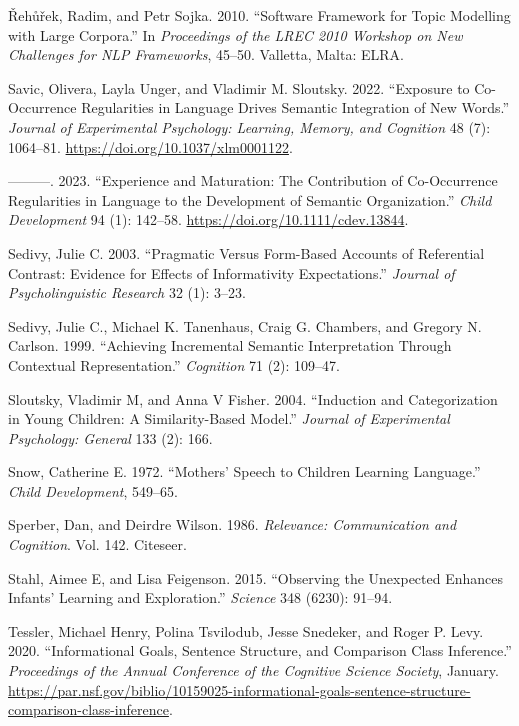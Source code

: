 \documentclass{ucetd}
\newlength{\cslhangindent}
\newenvironment{cslreferences}%
{\setlength{\parindent}{0pt}%
\everypar{\setlength{\hangindent}{\cslhangindent}}\ignorespaces}%
{\par}
\begin{document}
\begin{cslreferences}
\leavevmode\hypertarget{ref-rehurek2010}{}%
Řehůřek, Radim, and Petr Sojka. 2010. ``Software Framework for Topic
Modelling with Large Corpora.'' In \emph{Proceedings of the LREC 2010
Workshop on New Challenges for NLP Frameworks}, 45--50. Valletta, Malta:
ELRA.

\leavevmode\hypertarget{ref-savic_exposure_2022}{}%
Savic, Olivera, Layla Unger, and Vladimir M. Sloutsky. 2022. ``Exposure
to Co-Occurrence Regularities in Language Drives Semantic Integration of
New Words.'' \emph{Journal of Experimental Psychology: Learning, Memory,
and Cognition} 48 (7): 1064--81.
\url{https://doi.org/10.1037/xlm0001122}.

\leavevmode\hypertarget{ref-savic_experience_2023}{}%
---------. 2023. ``Experience and Maturation: The Contribution of
Co-Occurrence Regularities in Language to the Development of Semantic
Organization.'' \emph{Child Development} 94 (1): 142--58.
\url{https://doi.org/10.1111/cdev.13844}.

\leavevmode\hypertarget{ref-sedivy_pragmatic_2003}{}%
Sedivy, Julie C. 2003. ``Pragmatic Versus Form-Based Accounts of
Referential Contrast: Evidence for Effects of Informativity
Expectations.'' \emph{Journal of Psycholinguistic Research} 32 (1):
3--23.

\leavevmode\hypertarget{ref-sedivy_achieving_1999}{}%
Sedivy, Julie C., Michael K. Tanenhaus, Craig G. Chambers, and Gregory
N. Carlson. 1999. ``Achieving Incremental Semantic Interpretation
Through Contextual Representation.'' \emph{Cognition} 71 (2): 109--47.

\leavevmode\hypertarget{ref-sloutsky2004}{}%
Sloutsky, Vladimir M, and Anna V Fisher. 2004. ``Induction and
Categorization in Young Children: A Similarity-Based Model.''
\emph{Journal of Experimental Psychology: General} 133 (2): 166.

\leavevmode\hypertarget{ref-snow1972}{}%
Snow, Catherine E. 1972. ``Mothers' Speech to Children Learning
Language.'' \emph{Child Development}, 549--65.

\leavevmode\hypertarget{ref-sperber1986relevance}{}%
Sperber, Dan, and Deirdre Wilson. 1986. \emph{Relevance: Communication
and Cognition}. Vol. 142. Citeseer.

\leavevmode\hypertarget{ref-stahl2015}{}%
Stahl, Aimee E, and Lisa Feigenson. 2015. ``Observing the Unexpected
Enhances Infants' Learning and Exploration.'' \emph{Science} 348 (6230):
91--94.

\leavevmode\hypertarget{ref-tessler_informational_2020}{}%
Tessler, Michael Henry, Polina Tsvilodub, Jesse Snedeker, and Roger P.
Levy. 2020. ``Informational Goals, Sentence Structure, and Comparison
Class Inference.'' \emph{Proceedings of the Annual Conference of the
Cognitive Science Society}, January.
\url{https://par.nsf.gov/biblio/10159025-informational-goals-sentence-structure-comparison-class-inference}.


\end{cslreferences}
\end{document}
